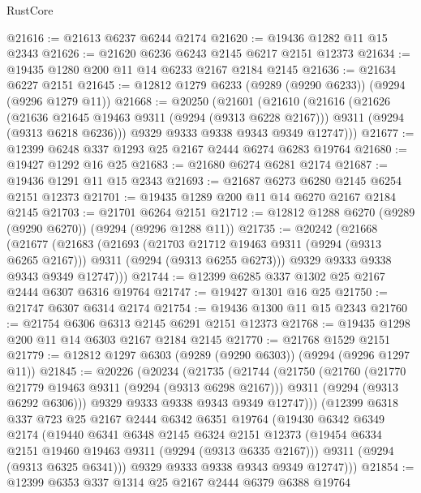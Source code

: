 \begin{lexlean}{RustCore}
\begin{coremodule}
@21616 := @21613 @6237 @6244 @2174
@21620 := @19436 @1282 @11 @15 @2343
@21626 := @21620 @6236 @6243 @2145 @6217 @2151 @12373
@21634 := @19435 @1280 @200 @11 @14 @6233 @2167 @2184 @2145
@21636 := @21634 @6227 @2151
@21645 := @12812 @1279 @6233 (@9289 (@9290 @6233)) (@9294 (@9296 @1279 @11))
@21668 := @20250
    (@21601
      (@21610
        (@21616
          (@21626
            (@21636 @21645 @19463 @9311 (@9294 (@9313 @6228 @2167)))
            @9311
            (@9294 (@9313 @6218 @6236)))
          @9329
          @9333
          @9338
          @9343
          @9349
          @12747)))
@21677 := @12399 @6248 @337 @1293 @25 @2167 @2444 @6274 @6283 @19764
@21680 := @19427 @1292 @16 @25
@21683 := @21680 @6274 @6281 @2174
@21687 := @19436 @1291 @11 @15 @2343
@21693 := @21687 @6273 @6280 @2145 @6254 @2151 @12373
@21701 := @19435 @1289 @200 @11 @14 @6270 @2167 @2184 @2145
@21703 := @21701 @6264 @2151
@21712 := @12812 @1288 @6270 (@9289 (@9290 @6270)) (@9294 (@9296 @1288 @11))
@21735 := @20242
    (@21668
      (@21677
        (@21683
          (@21693
            (@21703 @21712 @19463 @9311 (@9294 (@9313 @6265 @2167)))
            @9311
            (@9294 (@9313 @6255 @6273)))
          @9329
          @9333
          @9338
          @9343
          @9349
          @12747)))
@21744 := @12399 @6285 @337 @1302 @25 @2167 @2444 @6307 @6316 @19764
@21747 := @19427 @1301 @16 @25
@21750 := @21747 @6307 @6314 @2174
@21754 := @19436 @1300 @11 @15 @2343
@21760 := @21754 @6306 @6313 @2145 @6291 @2151 @12373
@21768 := @19435 @1298 @200 @11 @14 @6303 @2167 @2184 @2145
@21770 := @21768 @1529 @2151
@21779 := @12812 @1297 @6303 (@9289 (@9290 @6303)) (@9294 (@9296 @1297 @11))
@21845 := @20226
    (@20234
      (@21735
        (@21744
          (@21750
            (@21760
              (@21770 @21779 @19463 @9311 (@9294 (@9313 @6298 @2167)))
              @9311
              (@9294 (@9313 @6292 @6306)))
            @9329
            @9333
            @9338
            @9343
            @9349
            @12747)))
      (@12399
        @6318
        @337
        @723
        @25
        @2167
        @2444
        @6342
        @6351
        @19764
        (@19430
          @6342
          @6349
          @2174
          (@19440
            @6341
            @6348
            @2145
            @6324
            @2151
            @12373
            (@19454 @6334 @2151 @19460 @19463 @9311 (@9294 (@9313 @6335 @2167)))
            @9311
            (@9294 (@9313 @6325 @6341)))
          @9329
          @9333
          @9338
          @9343
          @9349
          @12747)))
@21854 := @12399 @6353 @337 @1314 @25 @2167 @2444 @6379 @6388 @19764

\end{coremodule}
\end{lexlean}
